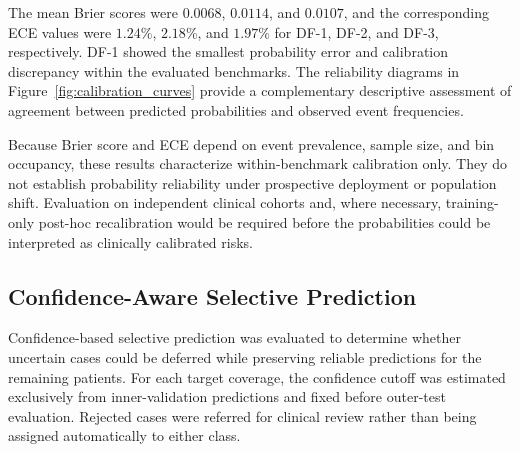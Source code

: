 \documentclass[pdflatex,sn-mathphys-num]{sn-jnl}%
\theoremstyle{thmstyleone}%
\theoremstyle{thmstyletwo}%
\theoremstyle{thmstylethree}%
\begin{document}
The mean Brier scores were \(0.0068\), \(0.0114\), and \(0.0107\), and the
corresponding ECE values were \(1.24\%\), \(2.18\%\), and \(1.97\%\) for
DF-1, DF-2, and DF-3, respectively. DF-1 showed the smallest probability
error and calibration discrepancy within the evaluated benchmarks. The
reliability diagrams in Figure~\ref{fig:calibration_curves} provide a
complementary descriptive assessment of agreement between predicted
probabilities and observed event frequencies.

 {
Because Brier score and ECE depend on event prevalence, sample size, and bin
occupancy, these results characterize within-benchmark calibration only.
They do not establish probability reliability under prospective deployment
or population shift. Evaluation on independent clinical cohorts and, where
necessary, training-only post-hoc recalibration would be required before the
probabilities could be interpreted as clinically calibrated risks.
}
\subsection{Confidence-Aware Selective Prediction}
\label{subsec:selective_prediction}

 {
Confidence-based selective prediction was evaluated to determine whether
uncertain cases could be deferred while preserving reliable predictions for
the remaining patients. For each target coverage, the confidence cutoff was
estimated exclusively from inner-validation predictions and fixed before
outer-test evaluation. Rejected cases were referred for clinical review rather
than being assigned automatically to either class.
}

\begingroup
 
\end{document}
